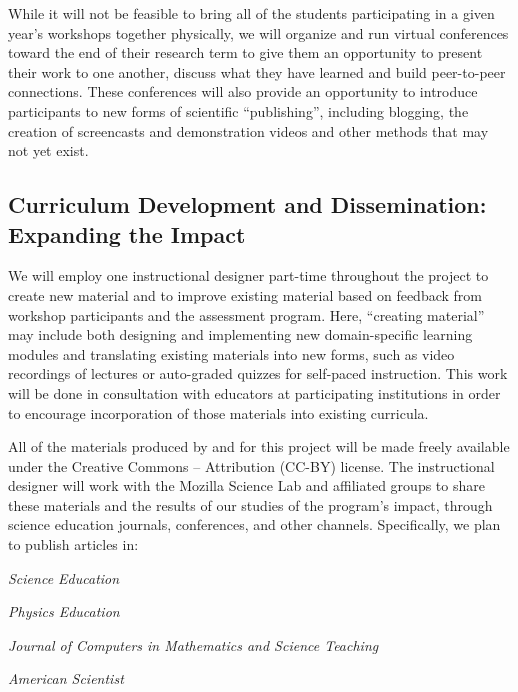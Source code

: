 \documentclass{proposalnsf}
\newlength{\up}
\begin{document}
While it will not be feasible to bring all of the students
participating in a given year's workshops together physically, we will
organize and run virtual conferences toward the end of their research
term to give them an opportunity to present their work to one another,
discuss what they have learned and build peer-to-peer connections.
These conferences will also provide an opportunity to introduce
participants to new forms of scientific ``publishing'', including
blogging, the creation of screencasts and demonstration videos and
other methods that may not yet exist.

\subsection{Curriculum Development and Dissemination: Expanding the Impact}

We will employ one instructional designer part-time throughout the
project to create new material and to improve existing material based
on feedback from workshop participants and the assessment program.
Here, ``creating material'' may include both designing and
implementing new domain-specific learning modules and translating
existing materials into new forms, such as video recordings of
lectures or auto-graded quizzes for self-paced instruction.  This work
will be done in consultation with educators at participating
institutions in order to encourage incorporation of those materials
into existing curricula.

All of the materials produced by and for this project will be made
freely available under the Creative Commons -- Attribution (CC-BY)
license.  The instructional designer will work with the Mozilla
Science Lab and affiliated groups to share these materials and the
results of our studies of the program's impact, through science
education journals, conferences, and other channels. Specifically, we
plan to publish articles in:

\begin{compactitem}

\item
  \emph{Science Education}

\item
  \emph{Physics Education}

\item
  \emph{Journal of Computers in Mathematics and Science Teaching}

\item
  \emph{American Scientist}

\end{compactitem}
\end{document}
